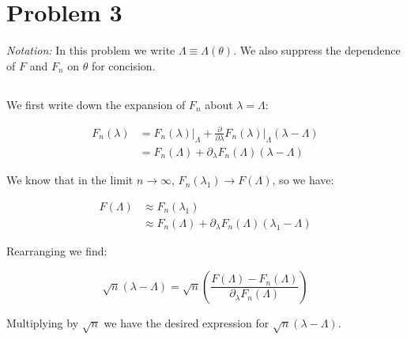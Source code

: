 \documentclass{article}
\begin{document}
\section{Problem 3}%
\label{sec:Problem 3}

\textit{Notation:} In this problem we write $\Lambda \equiv \Lambda \left( \theta \right)$.
We also suppress the dependence of $F$ and $F_n$ on $\theta$ for concision.
\subsection{}

We first write down the expansion of $F_n$ about $\lambda=\Lambda$:

\begin{equation}
\begin{split}
	F_n(\lambda) &= F_n \left( \lambda\right)\bigg\rvert_{\Lambda} + 
\frac{\partial}{\partial \lambda} F_n \left( \lambda \right) \bigg\rvert_{\Lambda}\left( \lambda - \Lambda \right) \\
		     &=F_n \left( \Lambda \right) + \partial_{\lambda}F_n \left(\Lambda \right) \left( \lambda-\Lambda \right)
\end{split}
\end{equation}

We know that in the limit $n\rightarrow\infty$, $F_n \left( \lambda_1 \right)\rightarrow F (\Lambda)$, so we have:

\begin{equation}
\begin{split}
	F \left( \Lambda \right) &\approx F_n \left( \lambda_1 \right) \\ 
				 &\approx F_n \left( \Lambda \right) + \partial_{\lambda}F_n \left(\Lambda \right) \left( \lambda_1-\Lambda \right)
\end{split}
\end{equation}

Rearranging we find: 

\begin{equation}\label{eq:scaled_deviation}
	\sqrt{n}\left( \lambda-\Lambda \right) = \sqrt{n} \left(\frac{F \left( \Lambda \right) -  F_n \left( \Lambda \right)}{\partial_{\lambda}F_n \left(\Lambda \right) }\right)
\end{equation}

Multiplying by $\sqrt{n}$ we have the desired expression for $\sqrt{n}\left( \lambda-\Lambda \right)$.

\subsection{}
\end{document}
